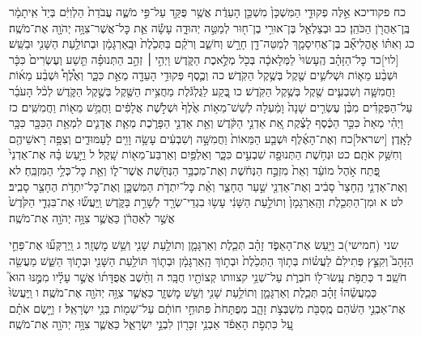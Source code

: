 \documentclass[twoside, openany, parskip=half, 11pt]{book}
\begin{document}
כח פקודיכא אֵ֣לֶּה פְקוּדֵ֤י הַמִּשְׁכָּן֙ מִשְׁכַּ֣ן הָעֵדֻ֔ת אֲשֶׁ֥ר פֻּקַּ֖ד עַל־פִּ֣י מֹשֶׁ֑ה עֲבֹדַת֙ הַלְוִיִּ֔ם בְּיַד֙ אִֽיתָמָ֔ר בֶּֽן־אַהֲרֹ֖ן הַכֹּהֵֽן׃ כב וּבְצַלְאֵ֛ל בֶּן־אוּרִ֥י בֶן־ח֖וּר לְמַטֵּ֣ה יְהוּדָ֑ה עָשָׂ֕ה אֵ֛ת כׇּל־אֲשֶׁר־צִוָּ֥ה יְהֹוָ֖ה אֶת־מֹשֶֽׁה׃ כג וְאִתּ֗וֹ אׇהֳלִיאָ֞ב בֶּן־אֲחִיסָמָ֛ךְ לְמַטֵּה־דָ֖ן חָרָ֣שׁ וְחֹשֵׁ֑ב וְרֹקֵ֗ם בַּתְּכֵ֙לֶת֙ וּבָֽאַרְגָּמָ֔ן וּבְתוֹלַ֥עַת הַשָּׁנִ֖י וּבַשֵּֽׁשׁ׃
[לוי]כד כׇּל־הַזָּהָ֗ב הֶֽעָשׂוּי֙ לַמְּלָאכָ֔ה בְּכֹ֖ל מְלֶ֣אכֶת הַקֹּ֑דֶשׁ וַיְהִ֣י ׀ זְהַ֣ב הַתְּנוּפָ֗ה תֵּ֤שַׁע וְעֶשְׂרִים֙ כִּכָּ֔ר וּשְׁבַ֨ע מֵא֧וֹת וּשְׁלֹשִׁ֛ים שֶׁ֖קֶל בְּשֶׁ֥קֶל הַקֹּֽדֶשׁ׃ כה וְכֶ֛סֶף פְּקוּדֵ֥י הָעֵדָ֖ה מְאַ֣ת כִּכָּ֑ר וְאֶ֩לֶף֩ וּשְׁבַ֨ע מֵא֜וֹת וַחֲמִשָּׁ֧ה וְשִׁבְעִ֛ים שֶׁ֖קֶל בְּשֶׁ֥קֶל הַקֹּֽדֶשׁ׃ כו בֶּ֚קַע לַגֻּלְגֹּ֔לֶת מַחֲצִ֥ית הַשֶּׁ֖קֶל בְּשֶׁ֣קֶל הַקֹּ֑דֶשׁ לְכֹ֨ל הָעֹבֵ֜ר עַל־הַפְּקֻדִ֗ים מִבֶּ֨ן עֶשְׂרִ֤ים שָׁנָה֙ וָמַ֔עְלָה לְשֵׁשׁ־מֵא֥וֹת אֶ֙לֶף֙ וּשְׁלֹ֣שֶׁת אֲלָפִ֔ים וַחֲמֵ֥שׁ מֵא֖וֹת וַחֲמִשִּֽׁים׃ כז וַיְהִ֗י מְאַת֙ כִּכַּ֣ר הַכֶּ֔סֶף לָצֶ֗קֶת אֵ֚ת אַדְנֵ֣י הַקֹּ֔דֶשׁ וְאֵ֖ת אַדְנֵ֣י הַפָּרֹ֑כֶת מְאַ֧ת אֲדָנִ֛ים לִמְאַ֥ת הַכִּכָּ֖ר כִּכָּ֥ר לָאָֽדֶן׃ [ישראל]כח וְאֶת־הָאֶ֜לֶף וּשְׁבַ֤ע הַמֵּאוֹת֙ וַחֲמִשָּׁ֣ה וְשִׁבְעִ֔ים עָשָׂ֥ה וָוִ֖ים לָעַמּוּדִ֑ים וְצִפָּ֥ה רָאשֵׁיהֶ֖ם וְחִשַּׁ֥ק אֹתָֽם׃ כט וּנְחֹ֥שֶׁת הַתְּנוּפָ֖ה שִׁבְעִ֣ים כִּכָּ֑ר וְאַלְפַּ֥יִם וְאַרְבַּע־מֵא֖וֹת שָֽׁקֶל׃ ל וַיַּ֣עַשׂ בָּ֗הּ אֶת־אַדְנֵי֙ פֶּ֚תַח אֹ֣הֶל מוֹעֵ֔ד וְאֵת֙ מִזְבַּ֣ח הַנְּחֹ֔שֶׁת וְאֶת־מִכְבַּ֥ר הַנְּחֹ֖שֶׁת אֲשֶׁר־ל֑וֹ וְאֵ֖ת כׇּל־כְּלֵ֥י הַמִּזְבֵּֽחַ׃ לא וְאֶת־אַדְנֵ֤י הֶֽחָצֵר֙ סָבִ֔יב וְאֶת־אַדְנֵ֖י שַׁ֣עַר הֶחָצֵ֑ר וְאֵ֨ת כׇּל־יִתְדֹ֧ת הַמִּשְׁכָּ֛ן וְאֶת־כׇּל־יִתְדֹ֥ת הֶחָצֵ֖ר סָבִֽיב׃ לט א וּמִן־הַתְּכֵ֤לֶת וְהָֽאַרְגָּמָן֙ וְתוֹלַ֣עַת הַשָּׁנִ֔י עָשׂ֥וּ בִגְדֵי־שְׂרָ֖ד לְשָׁרֵ֣ת בַּקֹּ֑דֶשׁ וַֽיַּעֲשׂ֞וּ אֶת־בִּגְדֵ֤י הַקֹּ֙דֶשׁ֙ אֲשֶׁ֣ר לְאַהֲרֹ֔ן כַּאֲשֶׁ֛ר צִוָּ֥ה יְהֹוָ֖ה אֶת־מֹשֶֽׁה׃

שני (חמישי)ב וַיַּ֖עַשׂ אֶת־הָאֵפֹ֑ד זָהָ֗ב תְּכֵ֧לֶת וְאַרְגָּמָ֛ן וְתוֹלַ֥עַת שָׁנִ֖י וְשֵׁ֥שׁ מׇשְׁזָֽר׃ ג וַֽיְרַקְּע֞וּ אֶת־פַּחֵ֣י הַזָּהָב֮ וְקִצֵּ֣ץ פְּתִילִם֒ לַעֲשׂ֗וֹת בְּת֤וֹךְ הַתְּכֵ֙לֶת֙ וּבְת֣וֹךְ הָֽאַרְגָּמָ֔ן וּבְת֛וֹךְ תּוֹלַ֥עַת הַשָּׁנִ֖י וּבְת֣וֹךְ הַשֵּׁ֑שׁ מַעֲשֵׂ֖ה חֹשֵֽׁב׃ ד כְּתֵפֹ֥ת עָֽשׂוּ־ל֖וֹ חֹבְרֹ֑ת עַל־שְׁנֵ֥י קצוותו קְצוֹתָ֖יו חֻבָּֽר׃ ה וְחֵ֨שֶׁב אֲפֻדָּת֜וֹ אֲשֶׁ֣ר עָלָ֗יו מִמֶּ֣נּוּ הוּא֮ כְּמַעֲשֵׂ֒הוּ֒ זָהָ֗ב תְּכֵ֧לֶת וְאַרְגָּמָ֛ן וְתוֹלַ֥עַת שָׁנִ֖י וְשֵׁ֣שׁ מׇשְׁזָ֑ר כַּאֲשֶׁ֛ר צִוָּ֥ה יְהֹוָ֖ה אֶת־מֹשֶֽׁה׃
ו וַֽיַּעֲשׂוּ֙ אֶת־אַבְנֵ֣י הַשֹּׁ֔הַם מֻֽסַבֹּ֖ת מִשְׁבְּצֹ֣ת זָהָ֑ב מְפֻתָּחֹת֙ פִּתּוּחֵ֣י חוֹתָ֔ם עַל־שְׁמ֖וֹת בְּנֵ֥י יִשְׂרָאֵֽל׃ ז וַיָּ֣שֶׂם אֹתָ֗ם עַ֚ל כִּתְפֹ֣ת הָאֵפֹ֔ד אַבְנֵ֥י זִכָּר֖וֹן לִבְנֵ֣י יִשְׂרָאֵ֑ל כַּאֲשֶׁ֛ר צִוָּ֥ה יְהֹוָ֖ה אֶת־מֹשֶֽׁה׃
\end{document}
